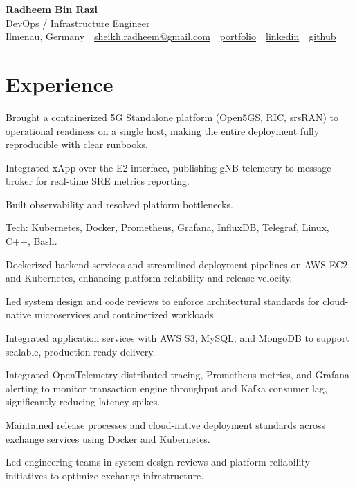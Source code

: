\documentclass[10pt,a4paper]{resume}
\makeatletter
\newcommand{\Portfolio}{https://radheem.github.io/my-cv}
\newcommand{\PortfolioText}{portfolio}
\newcommand{\GitHub}{https://github.com/radheem}
\newcommand{\LinkedIn}{https://www.linkedin.com/in/radheem-razi}
\newcommand{\Email}{sheikh.radheem@gmail.com}
\makeatother
\begin{document}
\begin{center}
  {\huge\bfseries Radheem Bin Razi}\\[3pt]
  {\large DevOps / Infrastructure Engineer}\\[6pt]
  \small
  Ilmenau, Germany \,\textbar\,
  \href{mailto:\Email}{\Email} \,\textbar\,
  \href{\Portfolio}{\PortfolioText} \,\textbar\,
  \href{\LinkedIn}{linkedin} \,\textbar\,
  \href{\GitHub}{github}
\end{center}
\vspace{2pt}

\section{Experience}

\bullets
  \item Brought a containerized 5G Standalone platform (Open5GS, RIC, srsRAN) to operational readiness on a single host, making the entire deployment fully reproducible with clear runbooks.
  \item Integrated xApp over the E2 interface, publishing gNB telemetry to message broker for real-time SRE metrics reporting.
  \item Built observability and resolved platform bottlenecks.
  \item Tech: Kubernetes, Docker, Prometheus, Grafana, InfluxDB, Telegraf, Linux, C++, Bash.
\bulletsend
\vspace{1.5pt}
\bullets
  \item Dockerized backend services and streamlined deployment pipelines on AWS EC2 and Kubernetes, enhancing platform reliability and release velocity.
  \item Led system design and code reviews to enforce architectural standards for cloud-native microservices and containerized workloads.
  \item Integrated application services with AWS S3, MySQL, and MongoDB to support scalable, production-ready delivery.
\bulletsend
\vspace{1.5pt}
\bullets
  \item Integrated OpenTelemetry distributed tracing, Prometheus metrics, and Grafana alerting to monitor transaction engine throughput and Kafka consumer lag, significantly reducing latency spikes.
  \item Maintained release processes and cloud-native deployment standards across exchange services using Docker and Kubernetes.
  \item Led engineering teams in system design reviews and platform reliability initiatives to optimize exchange infrastructure.
\bulletsend
\vspace{1.5pt}
\end{document}
